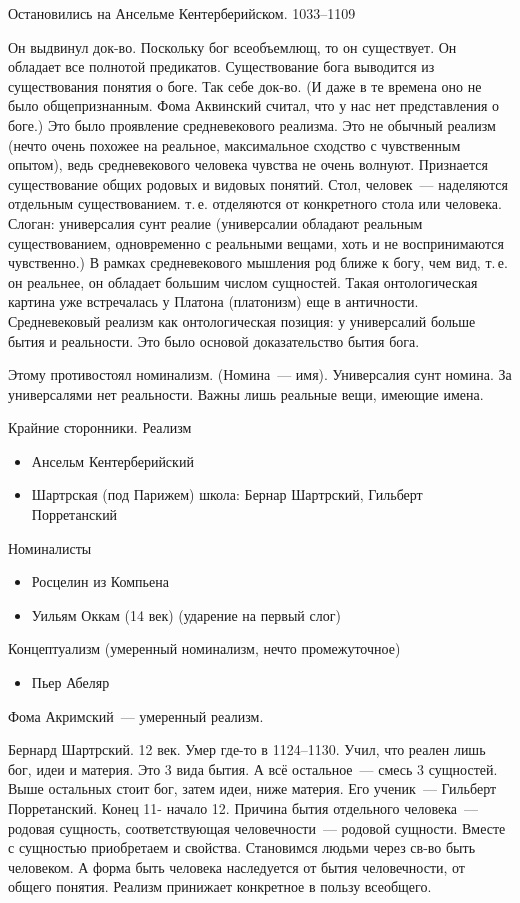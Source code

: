 Остановились на Ансельме Кентерберийском. 1033--1109

Он выдвинул док-во. Поскольку бог всеобъемлющ, то он существует. Он обладает все полнотой предикатов. Существование бога выводится из существования понятия о боге. Так себе док-во. (И даже в те времена оно не было общепризнанным. Фома Аквинский считал, что у нас нет представления о боге.) 
Это было проявление средневекового реализма. Это не обычный реализм (нечто очень похожее на реальное, максимальное сходство с чувственным опытом), ведь средневекового человека чувства не очень волнуют. Признается существование общих родовых и видовых понятий. Стол, человек~--- наделяются отдельным существованием. т.\,е. отделяются от конкретного стола или человека. Слоган: универсалия сунт реалие (универсалии обладают реальным существованием, одновременно с реальными вещами, хоть и не воспринимаются чувственно.) В рамках средневекового мышления род ближе к богу, чем вид, т.\,е. он реальнее, он обладает большим числом сущностей. Такая онтологическая картина уже встречалась у Платона (платонизм) еще в античности. Средневековый реализм как онтологическая позиция: у универсалий больше бытия и реальности. Это было основой доказательство бытия бога.

Этому противостоял номинализм. (Номина~--- имя). Универсалия сунт номина. За универсалями нет реальности. Важны лишь реальные вещи, имеющие имена.

Крайние сторонники.
Реализм

\begin{itemize}
	\item Ансельм Кентерберийский
	\item Шартрская (под Парижем) школа: Бернар Шартрский, Гильберт Порретанский
\end{itemize}

Номиналисты
\begin{itemize}
	\item Росцелин из Компьена
	\item Уильям Оккам (14 век) (ударение на первый слог) 
\end{itemize}

Концептуализм (умеренный номинализм, нечто промежуточное) 
\begin{itemize}
	\item Пьер Абеляр
\end{itemize}
Фома Акримский~--- умеренный реализм.

Бернард Шартрский. 12 век. Умер где-то в 1124--1130. Учил, что реален лишь бог, идеи и материя. Это 3 вида бытия. А всё остальное~--- смесь 3 сущностей. Выше остальных стоит бог, затем идеи, ниже материя.
Его ученик~--- Гильберт Порретанский. Конец 11- начало 12. Причина бытия отдельного человека~--- родовая сущность, соответствующая человечности~--- родовой сущности. Вместе с сущностью приобретаем и свойства. Становимся людьми через св-во быть человеком. А форма быть человека наследуется от бытия человечности, от общего понятия. Реализм принижает конкретное в пользу всеобщего.

